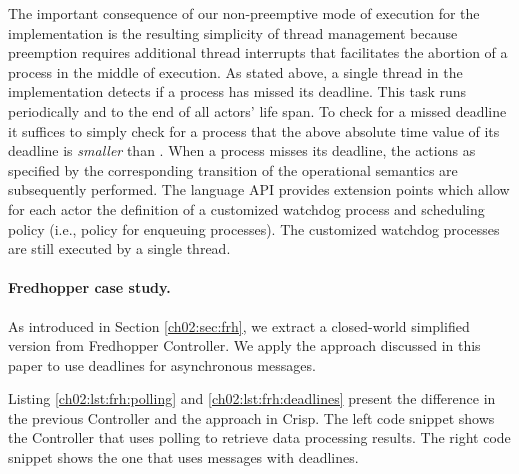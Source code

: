The important consequence of our non-preemptive mode of execution 
for the implementation is the resulting simplicity of thread management
because preemption requires additional thread interrupts that facilitates the abortion of a process in the middle of execution.
% 
As stated above,  a single  thread in the implementation detects if a process has missed its deadline.
This task  runs periodically and to the end of all actors' life span.
To check for a missed deadline it suffices to simply check  for a process 
that the  above absolute time value of its deadline is \emph{smaller} than
.
When a process misses its deadline,  the actions as specified by the corresponding transition of the operational semantics are subsequently performed.
% 
The language API provides  extension points which allow for each actor
the definition of a customized watchdog process and scheduling policy
(i.e., policy for enqueuing processes).
The customized  watchdog processes are still  executed by a single thread.


\paragraph*{Fredhopper case study.}
As introduced in Section \ref{ch02:sec:frh}, we extract a closed-world simplified version from Fredhopper Controller.
We apply the approach discussed in this paper to use deadlines for asynchronous messages.

Listing \ref{ch02:lst:frh:polling} and \ref{ch02:lst:frh:deadlines} present the difference in the previous Controller and the approach in Crisp.
The left code snippet shows the Controller that uses polling to retrieve data processing results.
The right code snippet shows the one that uses messages with deadlines.

